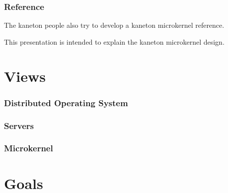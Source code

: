 
\begin{frame}
  \frametitle{Reference}

  The kaneton people also try to develop a kaneton microkernel reference.

  \nl

  This presentation is intended to explain the kaneton microkernel
  design.
\end{frame}

%
%

\section{Views}


\begin{frame}
  \frametitle{Distributed Operating System}

  \begin{center}
  \end{center}
\end{frame}


\begin{frame}
  \frametitle{Servers}

  \begin{center}
  \end{center}
\end{frame}


\begin{frame}
  \frametitle{Microkernel}

  \begin{center}
  \end{center}
\end{frame}

%
%

\section{Goals}


